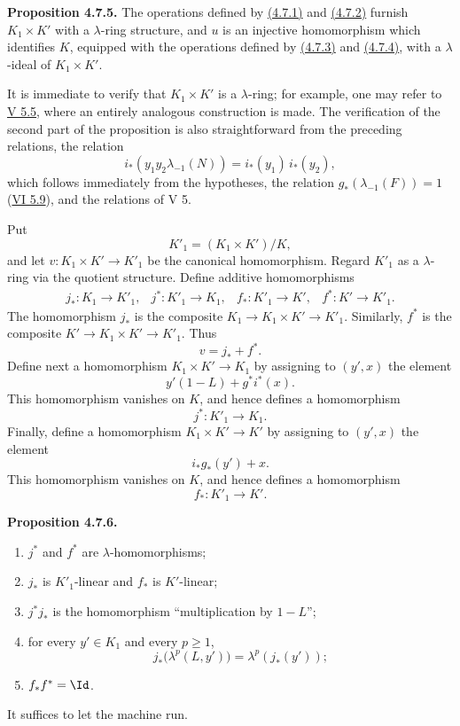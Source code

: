 \textbf{Proposition 4.7.5.} The operations defined by \hyperlink{sga6.e07.eq.4-7-1}{(4.7.1)} and \hyperlink{sga6.e07.eq.4-7-2}{(4.7.2)} furnish \(K_1\times K'\) with a \(\lambda\)-ring structure, and \(u\) is an injective homomorphism which identifies \(K\), equipped with the operations defined by \hyperlink{sga6.e07.eq.4-7-3}{(4.7.3)} and \hyperlink{sga6.e07.eq.4-7-4}{(4.7.4)}, with a \(\lambda\)-ideal of \(K_1\times K'\).

It is immediate to verify that \(K_1\times K'\) is a \(\lambda\)-ring; for example, one may refer to \hyperlink{sga6.e05.para.5-5}{V 5.5}, where an entirely analogous construction is made. The verification of the second part of the proposition is also straightforward from the preceding relations, the relation
\[
  i_*(y_1y_2\lambda_{-1}(N))=i_*(y_1)\,i_*(y_2),
\]
which follows immediately from the hypotheses, the relation \(g_*(\lambda_{-1}(F))=1\) (\hyperlink{sga6.e06.prop.5-9}{VI 5.9}), and the relations of V 5.

Put
\[
  K'_1=(K_1\times K')/K,
\]
and let \(v:K_1\times K'\to K'_1\) be the canonical homomorphism. Regard \(K'_1\) as a \(\lambda\)-ring via the quotient structure. Define additive homomorphisms
\[
\begin{array}{llll}
j_*:K_1\to K'_1, & j^*:K'_1\to K_1, &
f_*:K'_1\to K', & f^*:K'\to K'_1 .
\end{array}
\]
The homomorphism \(j_*\) is the composite \(K_1\to K_1\times K'\to K'_1\). Similarly, \(f^*\) is the composite \(K'\to K_1\times K'\to K'_1\). Thus
\[
  v=j_*+f^*.
\]
Define next a homomorphism \(K_1\times K'\to K_1\) by assigning to \((y',x)\) the element
\[
  y'(1-L)+g^*i^*(x).
\]
This homomorphism vanishes on \(K\), and hence defines a homomorphism
\[
  j^*:K'_1\longrightarrow K_1.
\]
Finally, define a homomorphism \(K_1\times K'\to K'\) by assigning to \((y',x)\) the element
\[
  i_*g_*(y')+x.
\]
This homomorphism vanishes on \(K\), and hence defines a homomorphism
\[
  f_*:K'_1\longrightarrow K'.
\]

\textbf{Proposition 4.7.6.}
\begin{enumerate}[label=\roman*)]
\item \(j^*\) and \(f^*\) are \(\lambda\)-homomorphisms;
\item \(j_*\) is \(K'_1\)-linear and \(f_*\) is \(K'\)-linear;
\item \(j^*j_*\) is the homomorphism ``multiplication by \(1-L\)'';
\item for every \(y'\in K_1\) and every \(p\ge1\),
\[
  j_*\bigl(\lambda^p(L,y')\bigr)=\lambda^p(j_*(y'));
\]
\item \(f_*f^*=\Id\).
\end{enumerate}
It suffices to let the machine run.

